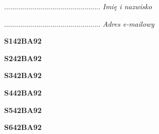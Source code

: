 \begin{turn}{90}\begin{minipage}{\linewidth} \vspace{20mm} ................................................  \textit{Imię i nazwisko}\end{minipage}\end{turn}

\begin{turn}{90}\begin{minipage}{\linewidth} \vspace{20mm} ................................................  \textit{Adres e-mailowy}\end{minipage}\end{turn}

\begin{turn}{90}\huge \begin{minipage}{\linewidth} \vspace{10mm}\textbf{S142BA92}\end{minipage}\end{turn}

\begin{turn}{90}\huge \begin{minipage}{\linewidth} \vspace{10mm}\textbf{S242BA92}\end{minipage}\end{turn}

\begin{turn}{90}\huge \begin{minipage}{\linewidth} \vspace{10mm}\textbf{S342BA92}\end{minipage}\end{turn}

\begin{turn}{90}\huge \begin{minipage}{\linewidth} \vspace{10mm}\textbf{S442BA92}\end{minipage}\end{turn}

\begin{turn}{90}\huge \begin{minipage}{\linewidth} \vspace{10mm}\textbf{S542BA92}\end{minipage}\end{turn}

\begin{turn}{90}\huge \begin{minipage}{\linewidth} \vspace{10mm}\textbf{S642BA92}\end{minipage}\end{turn}

